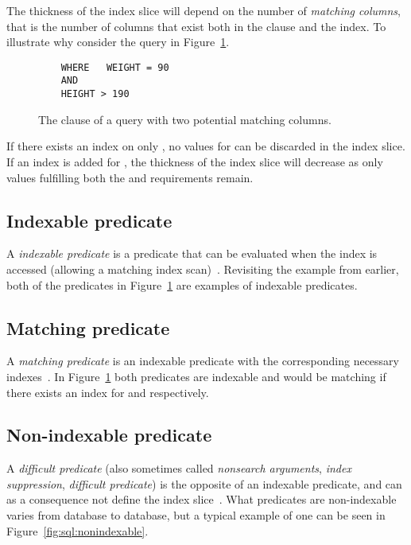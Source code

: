 The thickness of the index slice will depend on the number of \textit{matching
  columns}, that is the number of columns that exist both in the 
clause and the index. To illustrate why consider the query in
Figure~\ref{fig:sql:indexslice}.

\begin{figure}[ht]
  \begin{verbatim}
    WHERE   WEIGHT = 90
    AND
    HEIGHT > 190
  \end{verbatim}
  \caption[The  clause of a query with two potential matching
  columns]{The  clause of a query with two potential matching
    columns.}\label{fig:sql:indexslice}
\end{figure}

If there exists an index on only , no values for  can be
discarded in the index slice. If an index is added for , the
thickness of the index slice will decrease as only values fulfilling both the
 and  requirements remain.

\subsection*{Indexable predicate}
A \textit{indexable predicate} is a predicate that can be evaluated when the
index is accessed (allowing a matching index scan)~\cite{2014_summary_sopp,
  2013_ibm_ikcianp}. Revisiting the example from earlier, both of the predicates
in Figure~\ref{fig:sql:indexslice} are examples of indexable predicates.

\subsection*{Matching predicate}
A \textit{matching predicate} is an indexable predicate with the corresponding
necessary indexes~\cite{2013_ibm_ikcianp}. In Figure~\ref{fig:sql:indexslice}
both predicates are indexable and would be matching if there exists an index for
 and  respectively.

\subsection*{Non-indexable predicate}
A \textit{difficult predicate} (also sometimes called \textit{nonsearch
  arguments}, \textit{index suppression}, \textit{difficult predicate}) is the
opposite of an indexable predicate, and can as a consequence not define the
index slice~\cite{lahdenmaki_2005_relational_rdidatodossea}. What predicates are
non-indexable varies from database to database, but a typical example of one can
be seen in Figure~\ref{fig:sql:nonindexable}.

